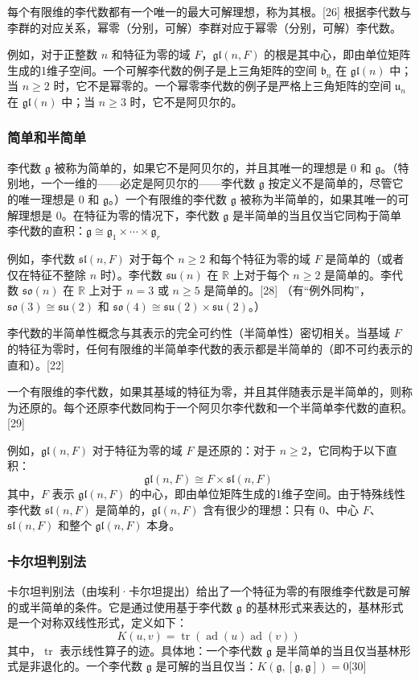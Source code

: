 每个有限维的李代数都有一个唯一的最大可解理想，称为其根。[26] 根据李代数与李群的对应关系，幂零（分别，可解）李群对应于幂零（分别，可解）李代数。

例如，对于正整数 \(n\) 和特征为零的域 \(F\)，\(\mathfrak{gl}(n,F)\) 的根是其中心，即由单位矩阵生成的1维子空间。一个可解李代数的例子是上三角矩阵的空间 \(\mathfrak{b}_n\) 在 \(\mathfrak{gl}(n)\) 中；当 \(n \geq 2\) 时，它不是幂零的。一个幂零李代数的例子是严格上三角矩阵的空间 \(\mathfrak{u}_n\) 在 \(\mathfrak{gl}(n)\) 中；当 \(n \geq 3\) 时，它不是阿贝尔的。
\subsubsection{简单和半简单}
李代数 \(\mathfrak{g}\) 被称为简单的，如果它不是阿贝尔的，并且其唯一的理想是 0 和 \(\mathfrak{g}\)。（特别地，一个一维的——必定是阿贝尔的——李代数 \(\mathfrak{g}\) 按定义不是简单的，尽管它的唯一理想是 0 和 \(\mathfrak{g}\)。）一个有限维的李代数 \(\mathfrak{g}\) 被称为半简单的，如果其唯一的可解理想是 0。在特征为零的情况下，李代数 \(\mathfrak{g}\) 是半简单的当且仅当它同构于简单李代数的直积：\(\mathfrak{g} \cong \mathfrak{g}_1 \times \cdots \times \mathfrak{g}_r
\)

例如，李代数 \(\mathfrak{sl}(n,F)\) 对于每个 \(n \geq 2\) 和每个特征为零的域 \(F\) 是简单的（或者仅在特征不整除 \(n\) 时）。李代数 \(\mathfrak{su}(n)\) 在 \(\mathbb{R}\) 上对于每个 \(n \geq 2\) 是简单的。李代数 \(\mathfrak{so}(n)\) 在 \(\mathbb{R}\) 上对于 \(n = 3\) 或 \(n \geq 5\) 是简单的。[28] （有“例外同构”，\(\mathfrak{so}(3) \cong \mathfrak{su}(2)\) 和 \(\mathfrak{so}(4) \cong \mathfrak{su}(2) \times \mathfrak{su}(2)\)。）

李代数的半简单性概念与其表示的完全可约性（半简单性）密切相关。当基域 \(F\) 的特征为零时，任何有限维的半简单李代数的表示都是半简单的（即不可约表示的直和）。[22]

一个有限维的李代数，如果其基域的特征为零，并且其伴随表示是半简单的，则称为还原的。每个还原李代数同构于一个阿贝尔李代数和一个半简单李代数的直积。[29]

例如，\(\mathfrak{gl}(n,F)\) 对于特征为零的域 \(F\) 是还原的：对于 \(n \geq 2\)，它同构于以下直积：
\[
\mathfrak{gl}(n,F) \cong F \times \mathfrak{sl}(n,F)~
\]
其中，\(F\) 表示 \(\mathfrak{gl}(n,F)\) 的中心，即由单位矩阵生成的1维子空间。由于特殊线性李代数 \(\mathfrak{sl}(n,F)\) 是简单的，\(\mathfrak{gl}(n,F)\) 含有很少的理想：只有 0、中心 \(F\)、\(\mathfrak{sl}(n,F)\) 和整个 \(\mathfrak{gl}(n,F)\) 本身。
\subsubsection{卡尔坦判别法}
卡尔坦判别法（由埃利·卡尔坦提出）给出了一个特征为零的有限维李代数是可解的或半简单的条件。它是通过使用基于李代数 \(\mathfrak{g}\) 的基林形式来表达的，基林形式是一个对称双线性形式，定义如下：
\[
K(u, v) = \operatorname{tr}(\operatorname{ad}(u) \operatorname{ad}(v))~
\]
其中，\(\operatorname{tr}\) 表示线性算子的迹。具体地：一个李代数 \(\mathfrak{g}\) 是半简单的当且仅当基林形式是非退化的。一个李代数 \(\mathfrak{g}\) 是可解的当且仅当：\(K(\mathfrak{g}, [\mathfrak{g}, \mathfrak{g}]) = 0\)[30]
